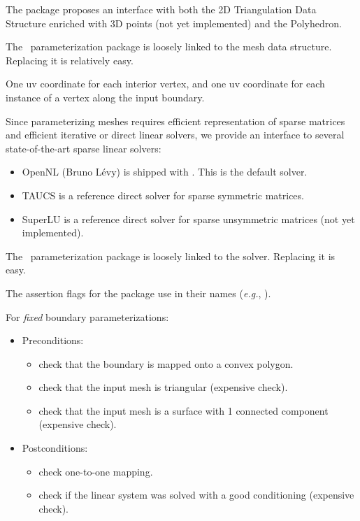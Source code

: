 The package proposes
an interface with both the 2D Triangulation Data Structure enriched
with 3D points (not yet implemented) and the Polyhedron.

The \cgal\ parameterization package is loosely linked to the
mesh data structure. Replacing it is relatively easy.



One uv coordinate for each interior vertex, and one uv coordinate for
each instance of a vertex along the input boundary.



Since parameterizing meshes requires
efficient representation of sparse matrices and efficient iterative or
direct linear solvers, we provide an interface to several state-of-the-art
sparse linear solvers:
\begin{itemize}
\item OpenNL (Bruno L{\'e}vy) is shipped with \cgal. This is the default solver.
\item TAUCS is a reference direct solver for sparse symmetric matrices.
\item SuperLU is a reference direct solver for sparse unsymmetric matrices (not yet implemented).
\end{itemize}

The \cgal\ parameterization package is loosely linked to the
solver. Replacing it is easy.



The assertion flags for the package
use  in their names (\textit{e.g.},
).

For \emph{fixed} boundary parameterizations:
\begin{itemize}
\item Preconditions:
    \begin{itemize}
    \item check that the boundary is mapped onto a convex polygon.
    \item check that the input mesh is triangular (expensive check).
    \item check that the input mesh is a surface with 1 connected component (expensive check).
    \end{itemize}
\item Postconditions:
    \begin{itemize}
    \item check one-to-one mapping.
    \item check if the linear system was solved with a good conditioning (expensive check).
    \end{itemize}
\end{itemize}


